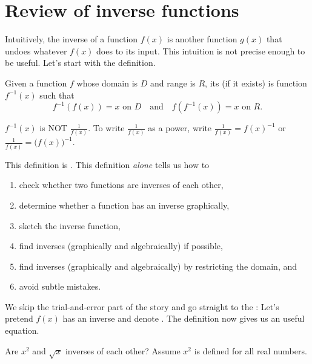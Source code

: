 \documentclass[../main.tex]{subfiles}
\begin{document}
 \section{Review of inverse functions}
Intuitively, the inverse of a function \(f(x)\) is another function \(g(x)\) that undoes whatever \(f(x)\) does to its input. This intuition is not precise enough to be useful. Let's start with the definition.

\begin{mdframed}[style=withref-compact]
  Given a function \(f\) whose domain is \(D\) and range is \(R\), its  (if it exists) is  function \(f^{-1}(x)\) such that
  \[
    f^{-1}(f(x)) = x \text{ on } D \quad\text{and}\quad f(f^{-1}(x)) = x \text{ on } R.
  \]

\end{mdframed}

{\faExclamationTriangle{} \(f^{-1}(x)\) is NOT \(\tfrac{1}{f(x)}\). To write \(\tfrac{1}{f(x)}\) as a power, write \(\tfrac{1}{f(x)} = f(x)^{-1}\) or \(\tfrac{1}{f(x)} = \big( f(x) \big)^{-1}\).}
\bigskip

This definition is . This definition \emph{alone} tells us how to
\begin{enumerate}[noitemsep]
  \item check whether two functions are inverses of each other, 
  \item determine whether a function has an inverse graphically, 
  \item sketch the inverse function, 
  \item find inverses (graphically and algebraically) if possible,
  \item find inverses (graphically and algebraically) by restricting the domain, and
  \item avoid subtle mistakes.
\end{enumerate}

We skip the trial-and-error part of the story and go straight to the : Let's pretend \(f(x)\) has an inverse and denote \underline{\hspace{2in}}. The definition now gives us an useful equation.

\clearpage

\begin{example}
  Are \(x^{2}\) and \(\sqrt{x}\) inverses of each other? Assume \(x^{2}\) is defined for all real numbers.

\end{example}
\end{document}
